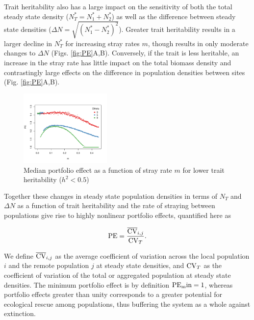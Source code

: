 \documentclass[twocolumn,preprintnumbers,amsmath,amssymb,superscriptaddress]{revtex4}
\begin{document}
Trait heritability also has a large impact on the sensitivity of both the total steady state density ($N^*_T=N^*_1+N^*_2$) as well as the difference between steady state densities ($\Delta N=\sqrt{(N^*_1-N^*_2)^2}$).
Greater trait heritability results in a larger decline in $N_T^*$ for increasing stray rates $m$, though results in only moderate changes to $\Delta N$ (Figs. \ref{fig:PE}A,B).
Conversely, if the trait is less heritable, an increase in the stray rate has little impact on the total biomass density and contrastingly large effects on the difference in population densities between sites (Fig. \ref{fig:PE}A,B).

\begin{figure}
\centering
\includegraphics[width=0.4\textwidth]{figs/fig_thetaPE.pdf}
\caption{
Median portfolio effect as a function of stray rate $m$ for lower trait heritability ($h^2 < 0.5$)
} \label{fig:thetaPE}
\end{figure}



Together these changes in steady state population densities in terms of $N_T$ and $\Delta N$ as a function of trait heritability and the rate of straying between populations give rise to highly nonlinear portfolio effects, quantified here as

\begin{equation}
  {\rm PE} = \frac{\overline{{\rm CV}}_{i,j}}{{\rm CV}_T}.
  \label{eq:pe}
\end{equation}

\noindent We define $\overline{{\rm CV}}_{i,j}$ as the average coefficient of variation across the local population $i$ and the remote population $j$ at steady state densities, and ${\rm CV}_T$ as the coefficient of variation of the total or aggregated population at steady state densities.
The minimum portfolio effect is by definition ${\rm PE_min}=1$, whereas portfolio effects greater than unity corresponds to a greater potential for ecological rescue among populations, thus buffering the system as a whole against extinction. 
\end{document}
